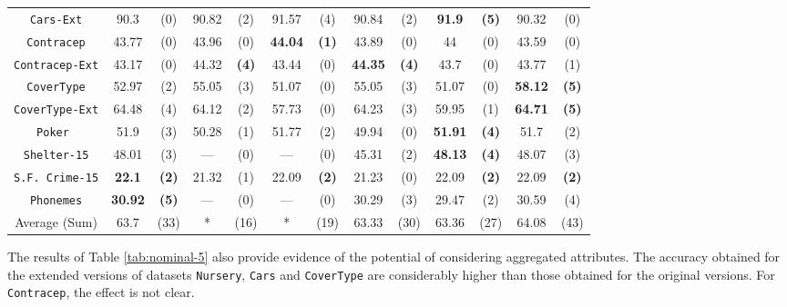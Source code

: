 \begin{table*}[t]
\begin{tabular}{c|cc|cc|cc|cc|cc|cc}
{\tt Cars-Ext}      & 90.3     & (0)    & 90.82    & (2)    & 91.57    & (4)    & 90.84    & (2)    &{\bf 91.9}&{\bf(5)}& 90.32    & (0)    \\
{\tt Contracep}     & 43.77    & (0)    & 43.96    & (0)    &{\bf44.04}&{\bf(1)}& 43.89    & (0)    & 44       & (0)    & 43.59    & (0)    \\
{\tt Contracep-Ext} & 43.17    & (0)    & 44.32    &{\bf(4)}& 43.44    & (0)    &{\bf44.35}&{\bf(4)}& 43.7     & (0)    & 43.77    & (1)    \\
{\tt CoverType}     & 52.97    & (2)    & 55.05    & (3)    & 51.07    & (0)    & 55.05    & (3)    & 51.07    & (0)    &{\bf58.12}&{\bf(5)}\\
{\tt CoverType-Ext} & 64.48    & (4)    & 64.12    & (2)    & 57.73    & (0)    & 64.23    & (3)    & 59.95    & (1)    &{\bf64.71}&{\bf(5)}\\ 
{\tt Poker }        & 51.9     & (3)    & 50.28    & (1)    & 51.77    & (2)    & 49.94    & (0)    &{\bf51.91}&{\bf(4)}& 51.7     & (2)    \\ 
{\tt Shelter-15}    & 48.01    & (3)    & ---      & (0)    & ---      & (0)    & 45.31    & (2)    &{\bf48.13}&{\bf(4)}& 48.07    & (3)    \\   
{\tt S.F. Crime-15} &{\bf22.1} &{\bf(2)}& 21.32    & (1)    & 22.09    &{\bf(2)}& 21.23    & (0)    & 22.09    &{\bf(2)}& 22.09    &{\bf(2)}\\ 
{\tt Phonemes}      &{\bf30.92}&{\bf(5)}& ---      & (0)    & ---      & (0)    & 30.29    & (3)    & 29.47    & (2)    & 30.59    & (4)    \\
\hline
Average (Sum)       &     63.7 & (33)   &     *    & (16)   &      *   & (19)   & 63.33    & (30)   & 63.36    & (27)   & 64.08    & (43)

\end{tabular}
\label{tab:nominal-5}
\normalsize
\end{table*}


The results of  Table \ref{tab:nominal-5} also
provide evidence of  the potential
of considering aggregated attributes. 
The accuracy obtained for the extended versions of datasets
{\tt Nursery}, {\tt Cars} and {\tt CoverType} are considerably higher than those obtained for 
the original versions. For {\tt Contracep}, the effect is not clear.

